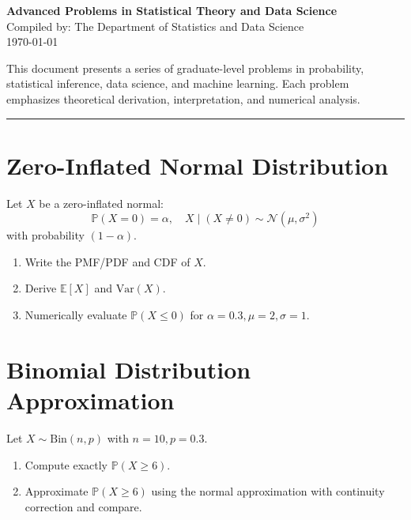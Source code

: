 \documentclass[12pt,a4paper]{article}
\begin{document}
\begin{center}
    {\LARGE \textbf{Advanced Problems in Statistical Theory and Data Science}}\\[1em]
    {\large Compiled by: The Department of Statistics and Data Science}\\[0.5em]
    {\large \today}
\end{center}

\bigskip

\noindent
This document presents a series of graduate-level problems in probability, statistical inference, data science, and machine learning. Each problem emphasizes theoretical derivation, interpretation, and numerical analysis.

\bigskip
\hrule
\bigskip

\setcounter{section}{0}
\renewcommand{\thesection}{\textbf{PROBLEM \arabic{section}.}}

\section{Zero-Inflated Normal Distribution}
Let \( X \) be a zero-inflated normal:
\[
\mathbb{P}(X = 0) = \alpha, \quad X \mid (X \neq 0) \sim \mathcal{N}(\mu, \sigma^2)
\]
with probability \( (1 - \alpha) \).
\begin{enumerate}[label=(\arabic*)]
\item Write the PMF/PDF and CDF of \( X \).
\item Derive \( \mathbb{E}[X] \) and \( \mathrm{Var}(X) \).
\item Numerically evaluate \( \mathbb{P}(X \leq 0) \) for \( \alpha = 0.3, \mu = 2, \sigma = 1 \).
\end{enumerate}

\section{Binomial Distribution Approximation}
Let \( X \sim \mathrm{Bin}(n, p) \) with \( n = 10, p = 0.3 \).
\begin{enumerate}[label=(\arabic*)]
\item Compute exactly \( \mathbb{P}(X \geq 6) \).
\item Approximate \( \mathbb{P}(X \geq 6) \) using the normal approximation with continuity correction and compare.
\end{enumerate}
\end{document}
